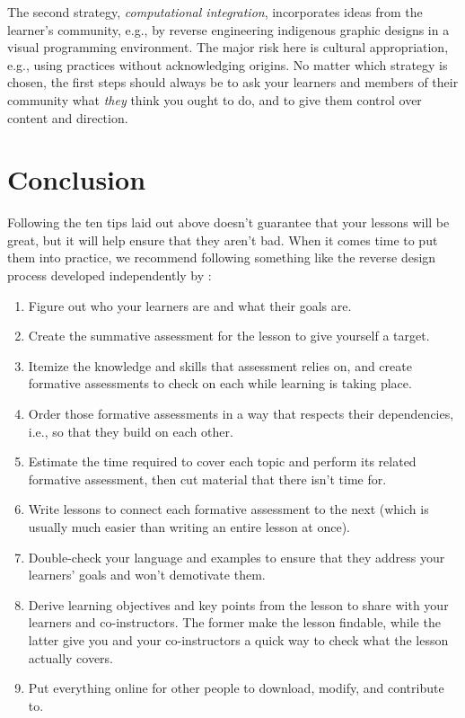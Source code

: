 \documentclass[10pt,letterpaper]{article}
\begin{document}
The second strategy, \emph{computational integration}, incorporates ideas from
the learner's community, e.g., by reverse engineering indigenous graphic designs
in a visual programming environment.  The major risk here is cultural
appropriation, e.g., using practices without acknowledging origins.  No matter
which strategy is chosen, the first steps should always be to ask your learners
and members of their community what \emph{they} think you ought to do, and to
give them control over content and direction.

\section*{Conclusion}

Following the ten tips laid out above doesn't guarantee that your lessons will
be great, but it will help ensure that they aren't bad.  When it comes time to
put them into practice, we recommend following something like the reverse design
process developed independently by \cite{Wigg2005,Bigg2011,Fink2013}:

\begin{enumerate}

\item Figure out who your learners are and what their goals are.

\item Create the summative assessment for the lesson to give yourself a target.

\item Itemize the knowledge and skills that assessment relies on, and create
  formative assessments to check on each while learning is taking place.

\item Order those formative assessments in a way that respects their
  dependencies, i.e., so that they build on each other.

\item Estimate the time required to cover each topic and perform its related
  formative assessment, then cut material that there isn't time for.

\item Write lessons to connect each formative assessment to the next (which is
  usually much easier than writing an entire lesson at once).

\item Double-check your language and examples to ensure that they address
  your learners' goals and won't demotivate them.

\item Derive learning objectives and key points from the lesson to share with
  your learners and co-instructors.  The former make the lesson findable, while
  the latter give you and your co-instructors a quick way to check what the
  lesson actually covers.

\item Put everything online for other people to download, modify, and contribute
  to.
  
\end{enumerate}
\end{document}
